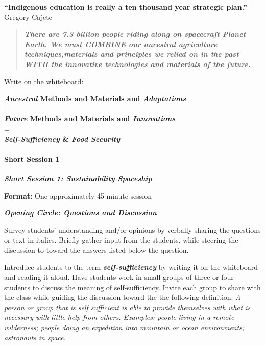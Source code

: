 \documentclass[12pt,]{article}
\let\oldparagraph\paragraph
\renewcommand{\paragraph}[1]{\oldparagraph{#1}\mbox{}}
\begin{document}
\textbf{``Indigenous education is really a ten thousand year strategic plan.''}
-- Gregory Cajete

\begin{quote}
\textbf{\emph{There are 7.3 billion people riding along on spacecraft Planet Earth.
We must COMBINE our ancestral agriculture techniques,materials and
principles we relied on in the past WITH the innovative technologies and
materials of the future.}}
\end{quote}

Write on the whiteboard:

\textbf{\emph{Ancestral} Methods and Materials and \emph{Adaptations}}\\
+\\
\textbf{\emph{Future} Methods and Materials and \emph{Innovations}}\\
=\\
\textbf{\emph{Self-Sufficiency} \& \emph{Food Security}}

\hypertarget{short-session-1}{%
\paragraph{Short Session 1}\label{short-session-1}}

\textbf{\emph{Short Session 1: Sustainability Spaceship}}

\textbf{Format:} One approximately 45 minute session

\textbf{\emph{Opening Circle: Questions and Discussion}}

Survey students' understanding and/or opinions by verbally sharing the
questions or text in italics. Briefly gather input from the students,
while steering the discussion to toward the answers listed below the
question.

Introduce students to the term \textbf{\emph{self-sufficiency}} by writing
it on the whiteboard and reading it aloud. Have students work in
small groups of three or four students to discuss the meaning of
self-sufficiency. Invite each group to share with the class while
guiding the discussion toward the the following definition: \emph{A
person or group that is self sufficient is able to provide
themselves with what is necessary with little help from others.
Examples: people living in a remote wilderness; people doing an
expedition into mountain or ocean environments; astronauts in
space.}
\end{document}
